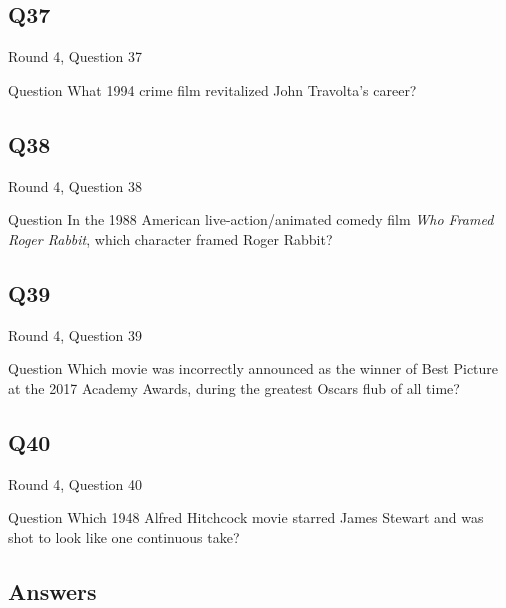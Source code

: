 \documentclass[11pt]{beamer}
\begin{document}
\subsection*{Q37}
\begin{frame}[t]{Round 4, Question 37}
\vspace{2em}
\begin{block}{Question}
What 1994 crime film revitalized John Travolta's career?
\end{block}
\end{frame}
    

\subsection*{Q38}
\begin{frame}[t]{Round 4, Question 38}
\vspace{2em}
\begin{block}{Question}
In the 1988 American live-action/animated comedy film \emph{Who Framed Roger Rabbit}, which character framed Roger Rabbit?
\end{block}
\end{frame}
    

\subsection*{Q39}
\begin{frame}[t]{Round 4, Question 39}
\vspace{2em}
\begin{block}{Question}
Which movie was incorrectly announced as the winner of Best Picture at the 2017 Academy Awards, during the greatest Oscars flub of all time?
\end{block}
\end{frame}
    

\subsection*{Q40}
\begin{frame}[t]{Round 4, Question 40}
\vspace{2em}
\begin{block}{Question}
Which 1948 Alfred Hitchcock movie starred James Stewart and was shot to look like one continuous take?
\end{block}
\end{frame}
    
\subsection{Answers}
\end{document}
